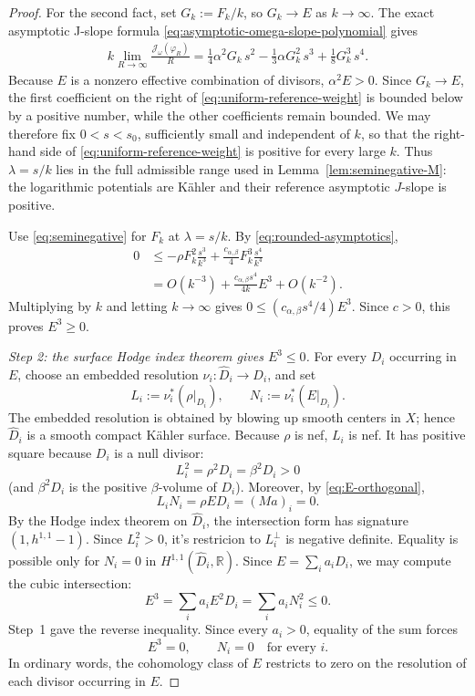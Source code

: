 \documentclass[reqno]{amsart}
\theoremstyle{remark}
\def\R{\mathbb{R}}
\def\cJ{{\mathcal J}}
\theoremstyle{plain}
\begin{document}
\begin{proof}
For the second fact, set $G_k:=F_k/k$, so $G_k\to E$ as $k\to \infty$.
The exact asymptotic J-slope formula
\eqref{eq:asymptotic-omega-slope-polynomial} gives
\begin{equation}\label{eq:uniform-reference-weight}
\begin{aligned}
 k\lim_{R\to \infty}\frac{\cJ_\omega(\varphi_R)}{R}
  =\frac14\alpha^2G_k\,s^2
       -\frac13\alpha G_k^2\,s^3
       +\frac18G_k^3\,s^4.
\end{aligned}
\end{equation}
Because $E$ is a nonzero effective combination of divisors,
$\alpha^2E>0$.  Since $G_k\to E$, the first coefficient on the
right of \eqref{eq:uniform-reference-weight} is bounded below by a
positive number, while the other
coefficients remain bounded.  We may therefore fix
$0<s<s_0$, sufficiently small and independent of $k$, so that the
right-hand side of \eqref{eq:uniform-reference-weight} is positive for
every large $k$.
Thus $\lambda=s/k$ lies in the full admissible range used in
Lemma~\ref{lem:seminegative-M}: the logarithmic potentials are K\"ahler and their
reference asymptotic $J$-slope is positive.

Use \eqref{eq:seminegative} for $F_k$ at $\lambda=s/k$.  By
\eqref{eq:rounded-asymptotics},
\[
\begin{aligned}
 0
 &\leq-\rho F_k^2\frac{s^3}{k^3}
       +\frac{c_{\alpha,\beta}}{4}F_k^3\frac{s^4}{k^4}\\
 &=O(k^{-3})+\frac{c_{\alpha,\beta}s^4}{4k}E^3+O(k^{-2}).
\end{aligned}
\]
Multiplying by $k$ and letting $k\to\infty$ gives
$0\leq(c_{\alpha,\beta}s^4/4)E^3$.  Since $c>0$, this proves $E^3\geq0$.

\smallskip
\noindent\emph{Step 2: the surface Hodge index theorem gives
$E^3\leq0$.}
For every $D_i$ occurring in $E$, choose an embedded resolution
$\nu_i:\widehat D_i\to D_i$, and set
\[
 L_i:=\nu_i^*(\rho|_{D_i}),\qquad
 N_i:=\nu_i^*(E|_{D_i}).
\]
The embedded resolution is obtained by blowing up smooth centers in
$X$; hence $\widehat D_i$ is a smooth compact K\"ahler surface.
Because $\rho$ is nef, $L_i$ is nef.  It has positive square because
$D_i$ is a null divisor:
\[
 L_i^2=\rho^2D_i=\beta^2D_i>0
\]
(and $\beta^2D_i$ is the positive $\beta$-volume of $D_i$).
Moreover, by \eqref{eq:E-orthogonal},
\[
 L_iN_i=\rho ED_i=(Ma)_i=0.
\]
By the Hodge index theorem on $\widehat{D}_i$, the intersection form has signature $(1,h^{1,1}-1)$. Since $L_i^2>0$, it's restricion to $L_i^\perp$ is negative definite. 
Equality is possible only for  $N_i=0$ in $H^{1,1}(\widehat D_i,\R)$.
Since $E=\sum_i a_iD_i$, we may compute the cubic intersection:
\[
 E^3=\sum_i a_iE^2D_i=\sum_i a_iN_i^2\leq0.
\]
Step~1 gave the reverse inequality.  Since every $a_i>0$, equality of
the sum forces 
\begin{equation}\label{eq:restrictionzero}
 E^3=0,\qquad N_i=0\quad\text{for every }i.
\end{equation}
In ordinary words, the cohomology class of $E$ restricts to zero on
the resolution of each divisor occurring in $E$.


\end{proof}
\end{document}
